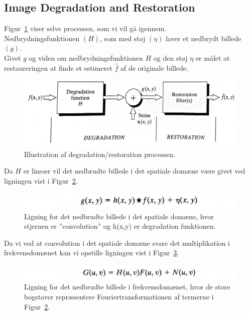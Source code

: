 \subsection{Image Degradation and Restoration}

Figur~\ref{fig:degradation-restoration-process} viser selve processen, som vi vil gå igennem.\\
Nedbrydningsfunktionen $(H)$, som med støj $(\eta)$ laver et nedbrydt billede $(g)$. \\
Givet $g$ og viden om nedbrydningsfunktionen $H$ og den støj $\eta$ er målet at restaureringen at finde et estimeret $\hat{f}$ af de originale billede.

\begin{figure}[h]
	\centering
	\includegraphics[width=0.9\linewidth]{figs/spm06/degradation-restoration-process}
	\caption{Illustration af degradation/restoration processen.}
	\label{fig:degradation-restoration-process}
\end{figure}

Da $H$ er lineær vil det nedbrudte billede i det spatiale domæne være givet ved ligningen vist i Figur~\ref{fig:degradation-spatial-eq}. 

\begin{figure}[h]
	\centering
	\includegraphics[width=0.7\linewidth]{figs/spm06/degradation-spatial-eq}
	\caption{Ligning for det nedbrudte billede i det spatiale domæne, hvor stjernen er ''convolution'' og h(x,y) er degradation funktionen.}
	\label{fig:degradation-spatial-eq}
\end{figure}

Da vi ved at convolution i det spatiale domæne svare det multiplikation i frekvensdomænet kan vi opstille ligningen vist i Figur~\ref{fig:degradation-freq-eq}.

\begin{figure}[h]
	\centering
	\includegraphics[width=0.7\linewidth]{figs/spm06/degradation-freq-eq}
	\caption{Ligning for det nedbrudte billede i frekvensdomænet, hvor de store bogstaver repræsentere Fouriertransformationen af termerne i Figur~\ref{fig:degradation-spatial-eq}.}
	\label{fig:degradation-freq-eq}
\end{figure}
